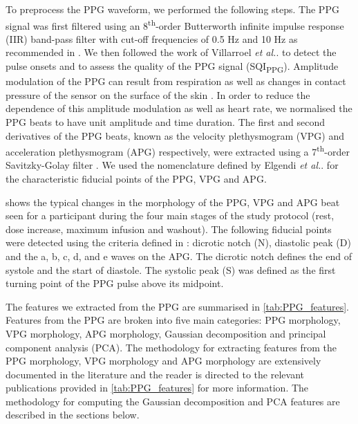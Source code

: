 \documentclass[fleqn,10pt]{wlscirep}
\begin{document}
To preprocess the PPG waveform, we performed the following steps. The PPG signal was first filtered using an 8\textsuperscript{th}-order Butterworth infinite impulse response (IIR) band-pass filter with cut-off frequencies of 0.5 Hz and 10 Hz as recommended in \cite{Mukkamala2015}. We then followed the work of Villarroel \textit{et al.}. \cite{Villarroel2020} to detect the pulse onsets and to assess the quality of the PPG signal (SQI\textsubscript{PPG}). Amplitude modulation of the PPG can result from respiration  \cite{Charlton2017} as well as changes in contact pressure of the sensor on the surface of the skin \cite{Chandrasekhar2020}. In order to reduce the dependence of this amplitude modulation as well as heart rate, we normalised the PPG beats to have unit amplitude and time duration. The first and second derivatives of the PPG beats, known as the velocity plethysmogram (VPG) and acceleration plethysmogram (APG) respectively, were extracted using a 7\textsuperscript{th}-order Savitzky-Golay filter \cite{Orfanidis1995}. We used the nomenclature defined by Elgendi \textit{et al.}. \cite{Elgendi2018} for the characteristic fiducial points of the PPG, VPG and APG. 


 shows the typical changes in the morphology of the PPG, VPG and APG beat seen for a participant during the four main stages of the study protocol (rest, dose increase, maximum infusion and washout). The following fiducial points were detected using the criteria defined in \cite{Charlton2018}: dicrotic notch (N), diastolic peak (D) and the a, b, c, d, and e waves on the APG. The dicrotic notch defines the end of systole and the start of diastole. The systolic peak (S) was defined as the first turning point of the PPG pulse above its midpoint. 

The features we extracted from the PPG are summarised in \cref{tab:PPG_features}. Features from the PPG are broken into five main categories: PPG morphology, VPG morphology, APG morphology, Gaussian decomposition and principal component analysis (PCA). The methodology for extracting features from the PPG morphology, VPG morphology and APG morphology are extensively documented in the literature \cite{Hosanee2020, Elgendi2019} and the reader is directed to the relevant publications provided in \cref{tab:PPG_features} for more information. The methodology for computing the Gaussian decomposition and PCA features are described in the sections below.

\def\figHeight{9.7cm}
\end{document}
